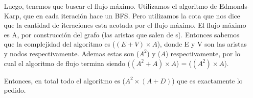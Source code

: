 \par{Luego, tenemos que buscar el flujo máximo. Utilizamos el algoritmo de Edmonds-Karp, que en cada iteración hace un BFS.
Pero utilizamos la cota que nos dice que la cantidad de iteraciones esta acotada por el flujo máximo. 
El flujo máximo es A, por construcción del grafo (las aristas que salen de s).
Entonces sabemos que la complejidad del algoritmo es \bigo($ (E + V) \times A$), donde E y V son las aristas y nodos respectivamente.
Ademas estas son \bigo($A^2$) y \bigo($A$) respectivamente, por lo cual el algoritmo de flujo termina siendo \bigo($ (A^2 + A) \times A$) 
= \bigo($ (A^2) \times A$). }

\par{Entonces, en total todo el algoritmo es \bigo($ A^2 \times (A + D) $) que es exactamente lo pedido.}
